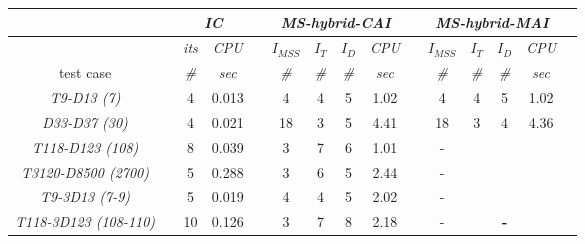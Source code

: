 \begin{table}[h!]
\begin{adjustbox}{width=\textwidth}
\begin{tabular}{@{}l c cc c  cccc c cccc c  @{}}
\end{tabular}
\end{adjustbox}
\begin{adjustbox}{width=1\textwidth} %
\small
\begin{tabular}{@{}l c cc c  cccc c cccc c  @{}}\toprule
                               && \multicolumn{2}{c}{\textit{IC}} &&     \multicolumn{4}{c}{\textit{MS-hybrid-CAI}} && \multicolumn{4}{c}{\textit{MS-hybrid-MAI}} \\ \midrule 
\multicolumn{1}{l}{}        && \textit{its}      & \textit{CPU} && $I_{MSS}$      & $I_T$   &  $I_D$      & \textit{CPU}     &&$I_{MSS}$      & $I_T$   &  $I_D$      & \textit{CPU}      \\
\cmidrule{3-4}  \cmidrule{6-9}  \cmidrule{11-14}   
\multicolumn{1}{c}{test case}      && \textit{\#}       & \textit{sec} && \textit{\#}      & \textit{\#}    & \textit{\#}       & \textit{sec}     && \textit{\#}        & \textit{\#}     &  \textit{\#}       & \textit{sec}  \\
\midrule
\multicolumn{1}{c}{\textit{T9-D13 (7)}}           && 4  & {0.013}    && 4  & 4 & 5 &  1.02 && 4  & 4 & 5 & {1.02}\\
\multicolumn{1}{c}{\textit{D33-D37 (30)}}         && 4  & {0.021}    && 18 & 3 & 5 &  4.41 && 18  & 3 &  4 & {4.36}\\
\multicolumn{1}{c}{{\textit{T118-D123 (108)}}}    && 8  & {0.039}    && 3  & 7 & 6 &  1.01 && -  &  &  &    \\
\multicolumn{1}{c}{{\textit{T3120-D8500 (2700)}}} && 5  & {0.288}    && 3  & 6 & 5 &  2.44 && -  &  &  &  \\
\multicolumn{1}{c}{{\textit{T9-3D13 (7-9)}}}      && 5  & {0.019}    && 4  & 4 & 5 &  2.02 && -  &  &  &      \\
 \multicolumn{1}{l}{\textit{T118-3D123 (108-110)}}          && 10 & 0.126    && 3  & 7 & 8 &  2.18 && -  &  & \textbf{-} \\
\toprule 
\end{tabular}
\end{adjustbox}
\end{table}
